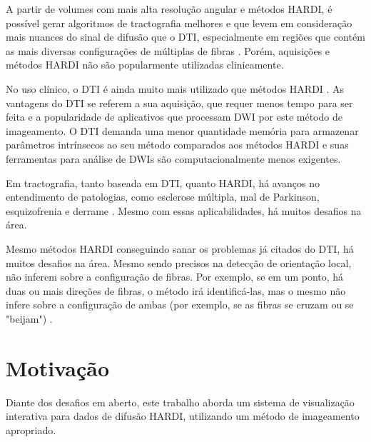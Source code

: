 \documentclass[
    12pt,                %
    oneside,            %
    a4paper,            %
    english,            %
    french,                %
    spanish,            %
    brazil                %
    ]{abntex2}
\begin{document}
A partir de volumes com mais alta resolução angular e métodos HARDI, é possível gerar algoritmos de tractografia melhores e que levem em consideração mais nuances do sinal de difusão que o DTI, especialmente em regiões que contém as mais diversas configurações de múltiplas de fibras \cite{fillard2011}. Porém, aquisições e métodos HARDI não são popularmente utilizadas clinicamente. %

No uso clínico, o DTI é ainda muito mais utilizado que métodos HARDI \cite{descoteaux2015}. As vantagens do DTI se referem a sua aquisição, que requer menos tempo para ser feita e a popularidade de aplicativos que processam DWI por este método de imageamento. O DTI demanda uma menor quantidade memória para armazenar parâmetros intrínsecos ao seu método comparados aos métodos HARDI e suas ferramentas para análise de DWIs são computacionalmente menos exigentes.


Em tractografia, tanto baseada em DTI, quanto HARDI, há avanços no entendimento de patologias, como esclerose múltipla, mal de Parkinson, esquizofrenia e derrame \cite{SCHILLING2019194}. Mesmo com essas aplicabilidades, há muitos desafios na área.

Mesmo métodos HARDI conseguindo sanar os problemas já citados do DTI, há muitos desafios na área. Mesmo sendo precisos na detecção de orientação local, não inferem sobre a configuração de fibras. Por exemplo, se em um ponto, há duas ou mais direções de fibras, o método irá identificá-las, mas o mesmo não infere sobre a configuração de ambas (por exemplo, se as fibras se cruzam ou se "beijam") \cite{SCHILLING2019194}.





\section{Motivação}
\label{ssec:motivation}

Diante dos desafios em aberto, este trabalho aborda um sistema de visualização interativa para dados de difusão HARDI, utilizando um método de imageamento apropriado.
\end{document}

